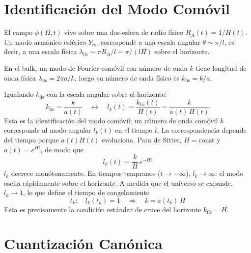 \documentclass[12pt,a4paper]{article}
\begin{document}
\section{Identificación del Modo Comóvil}

El campo $\phi(\Omega, t)$ vive sobre una dos-esfera de radio físico $R_A(t) = 1/H(t)$. Un modo armónico esférico $Y_{lm}$ corresponde a una escala angular $\theta \sim \pi / l$, es decir, a una escala física $\lambda_\text{fís} \sim \pi R_A / l = \pi / (lH)$ sobre el horizonte.

En el bulk, un modo de Fourier comóvil con número de onda $k$ tiene longitud de onda física $\lambda_\text{fís} = 2\pi a / k$, luego su número de onda físico es $k_\text{fís} = k/a$.

Igualando $k_\text{fís}$ con la escala angular sobre el horizonte:
\begin{equation}
k_\text{fís} = \frac{k}{a(t)} \quad \longleftrightarrow \quad l_k(t) = \frac{k_\text{fís}(t)}{H(t)} = \frac{k}{a(t)\,H(t)} \tag{2}
\end{equation}
Esta es la identificación del modo comóvil: un número de onda comóvil $k$ corresponde al modo angular $l_k(t)$ en el tiempo $t$. La correspondencia depende del tiempo porque $a(t)H(t)$ evoluciona. Para de Sitter, $H = \text{const}$ y $a(t) = e^{Ht}$, de modo que
\begin{equation}
l_k(t) = \frac{k}{H}\,e^{-Ht} \tag{3}
\end{equation}
$l_k$ decrece monótonamente. En tiempos tempranos ($t \to -\infty$), $l_k \to \infty$: el modo oscila rápidamente sobre el horizonte. A medida que el universo se expande, $l_k \to 1$, lo que define el tiempo de congelamiento
\begin{equation}
t_k: \quad l_k(t_k) = 1 \quad \Longrightarrow \quad k = a(t_k)\,H \tag{4}
\end{equation}
Esta es precisamente la condición estándar de cruce del horizonte $k_\text{fís} = H$.

\section{Cuantización Canónica}
\end{document}
